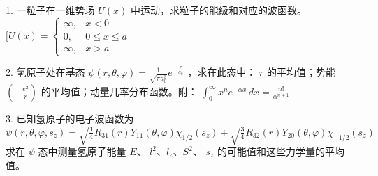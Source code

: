 1. 一粒子在一维势场 $U(x)$ 中运动，求粒子的能级和对应的波函数。
$[ U(x) = \begin{cases} \infty, & x < 0 \\0, & 0 \le x \le a \\\infty, & x > a \end{cases}$

2. 氢原子处在基态 $\psi (r, \theta, \varphi) = \frac{1}{\sqrt{\pi a_0^3}} e^{-\frac{r}{a_0}}$ ，求在此态中： $r$ 的平均值；势能 $( -\frac{e^2}{r} )$ 的平均值；动量几率分布函数。附： 
$\int_0^\infty x^n e^{-\alpha x} \, dx = \frac{n!}{\alpha^{n+1}}$

3. 已知氢原子的电子波函数为 
$\psi(r, \theta, \varphi, s_z) = \sqrt{\frac{1}{4}} R_{31}(r) Y_{11}(\theta, \varphi) \chi_{1/2}(s_z) + \sqrt{\frac{3}{4}} R_{32}(r) Y_{20}(\theta, \varphi) \chi_{-1/2}(s_z)$
求在 $\psi$ 态中测量氢原子能量 $E$、 $l^2$、$l_z$、$ S^2 $、 $s_z$ 的可能值和这些力学量的平均值。

